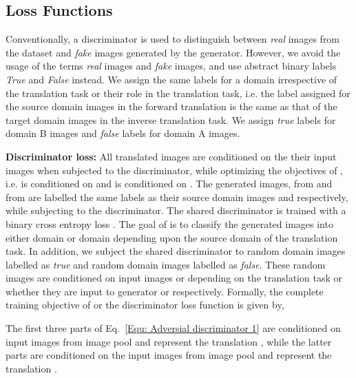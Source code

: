 \documentclass[a4paper,twoside]{article}
\begin{document}
\subsection{Loss Functions}
\label{Loss Functions}
\noindent
Conventionally, a discriminator is used to distinguish between \textit{real} images from the dataset and \textit{fake} images generated by the generator. However, we avoid the usage of the terms \textit{real} images and \textit{fake} images, and use abstract binary labels \textit{True} and \textit{False} instead. We assign the same labels for a domain irrespective of the translation task or their role in the translation task, i.e. the label assigned for the source domain images in the forward translation is the same as that of the target domain images in the inverse translation task. We assign \textit{true} labels for domain B images and \textit{false} labels for domain A images.

\noindent\textbf{Discriminator loss:} 
All translated images are conditioned on the their input images when subjected to the discriminator, while optimizing the objectives of , i.e.  is conditioned on  and  is conditioned on .
The generated images,  from  and  from  are labelled the same labels as their source domain images  and  respectively, while subjecting to the discriminator.
The shared discriminator  is trained with a binary cross entropy loss .
The goal of  is to classify the generated images into either domain  or domain  depending upon the source domain of the translation task. In addition, we subject the shared discriminator to random domain  images labelled as \textit{true} and random domain  images labelled as \textit{false}. These random images are conditioned on input images  or  depending on the translation task or whether they are input to generator  or  respectively. Formally, the complete training objective of  or the discriminator loss function is given by,

The first three parts of Eq.~\ref{Equ: Adversial discriminator 1} are conditioned on input images  from image pool  and represent the translation , while the latter parts are conditioned on the input images  from image pool  and represent the translation .
\end{document}
